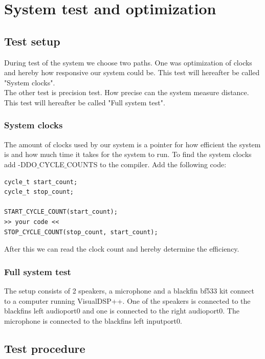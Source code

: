 \chapter{System test and optimization}
\section{Test setup}
During test of the system we choose two paths. One was optimization of clocks and hereby how responsive our system could be. This test will hereafter be called "System clocks".\\
The other test is precision test. How precise can the system measure distance. This test will hereafter be called "Full system test".\\
\subsection{System clocks}
The amount of clocks used by our system is a pointer for how efficient the system is and how much time it takes for the system to run. To find the system clocks add -DDO$\_$CYCLE$\_$COUNTS to the compiler. Add the following code:\\
\begin{lstlisting}
cycle_t start_count;
cycle_t stop_count;
	
START_CYCLE_COUNT(start_count);
>> your code <<
STOP_CYCLE_COUNT(stop_count, start_count);
\end{lstlisting}
After this we can read the clock count and hereby determine the efficiency.
\subsection{Full system test}
The setup consists of 2 speakers, a microphone and a blackfin bf533 kit connect to a computer running VisualDSP++. One of the speakers is connected to the blackfins left audioport0 and one is connected to the right audioport0. The microphone is connected to the blackfins left inputport0. 

\section{Test procedure}
